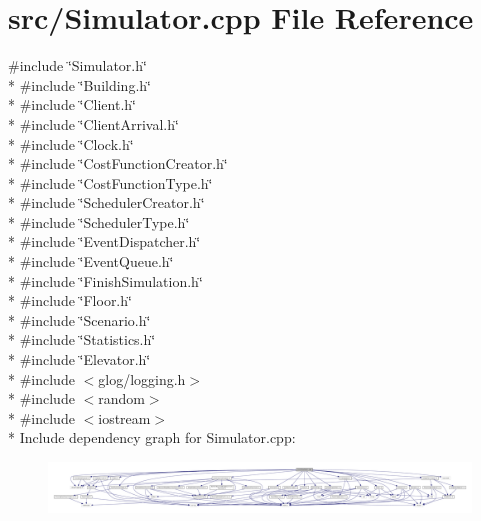 \section{src/\+Simulator.cpp File Reference}
\label{_simulator_8cpp}
{\ttfamily \#include \char`\"{}Simulator.\+h\char`\"{}}\\*
{\ttfamily \#include \char`\"{}Building.\+h\char`\"{}}\\*
{\ttfamily \#include \char`\"{}Client.\+h\char`\"{}}\\*
{\ttfamily \#include \char`\"{}Client\+Arrival.\+h\char`\"{}}\\*
{\ttfamily \#include \char`\"{}Clock.\+h\char`\"{}}\\*
{\ttfamily \#include \char`\"{}Cost\+Function\+Creator.\+h\char`\"{}}\\*
{\ttfamily \#include \char`\"{}Cost\+Function\+Type.\+h\char`\"{}}\\*
{\ttfamily \#include \char`\"{}Scheduler\+Creator.\+h\char`\"{}}\\*
{\ttfamily \#include \char`\"{}Scheduler\+Type.\+h\char`\"{}}\\*
{\ttfamily \#include \char`\"{}Event\+Dispatcher.\+h\char`\"{}}\\*
{\ttfamily \#include \char`\"{}Event\+Queue.\+h\char`\"{}}\\*
{\ttfamily \#include \char`\"{}Finish\+Simulation.\+h\char`\"{}}\\*
{\ttfamily \#include \char`\"{}Floor.\+h\char`\"{}}\\*
{\ttfamily \#include \char`\"{}Scenario.\+h\char`\"{}}\\*
{\ttfamily \#include \char`\"{}Statistics.\+h\char`\"{}}\\*
{\ttfamily \#include \char`\"{}Elevator.\+h\char`\"{}}\\*
{\ttfamily \#include $<$glog/logging.\+h$>$}\\*
{\ttfamily \#include $<$random$>$}\\*
{\ttfamily \#include $<$iostream$>$}\\*
Include dependency graph for Simulator.\+cpp\+:\nopagebreak
\begin{figure}[H]
\begin{center}
\leavevmode
\includegraphics[width=350pt]{_simulator_8cpp__incl}
\end{center}
\end{figure}

